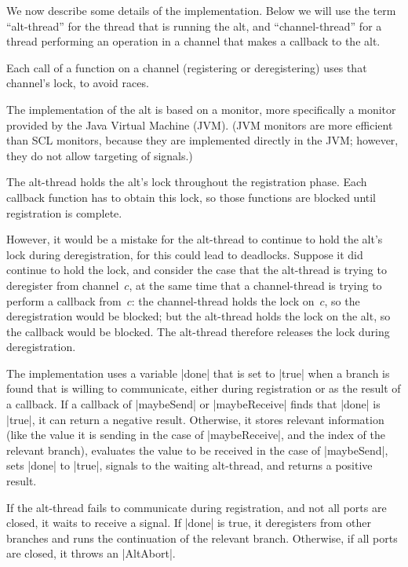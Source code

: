 We now describe some details of the implementation.  Below we will use the
term ``alt-thread'' for the thread that is running the alt, and
``channel-thread'' for a thread performing an operation in a channel that
makes a callback to the alt. 

Each call of a function on a channel (registering or deregistering) uses that
channel's lock, to avoid races.  

The implementation of the alt is based on a monitor, more specifically a
monitor provided by the Java Virtual Machine (JVM).  (JVM monitors are more
efficient than SCL monitors, because they are implemented directly in the JVM;
however, they do not allow targeting of signals.)  

The alt-thread holds the alt's lock throughout the registration phase.  Each
callback function has to obtain this lock, so those functions are blocked
until registration is complete. 

However, it would be a mistake for the alt-thread to continue to hold the
alt's lock during deregistration, for this could lead to deadlocks.  Suppose
it did continue to hold the lock, and consider the case that the alt-thread is
trying to deregister from channel~$c$, at the same time that a channel-thread
is trying to perform a callback from~$c$: the channel-thread holds the lock
on~$c$, so the deregistration would be blocked; but the alt-thread holds the
lock on the alt, so the callback would be blocked.  The alt-thread therefore
releases the lock during deregistration. 

The implementation uses a variable |done| that is set to |true| when a
branch is found that is willing to communicate, either during registration or
as the result of a callback.  If a callback of |maybeSend| or |maybeReceive|
finds that |done| is |true|, it can return a negative result.  Otherwise, it
stores relevant information (like the value it is sending in the case of
|maybeReceive|, and the index of the relevant branch), evaluates the value to
be received in the case of |maybeSend|, sets |done| to |true|, signals to the
waiting alt-thread, and returns a positive result.

If the alt-thread fails to communicate during registration, and not all
ports are closed, it waits to receive a signal.  If |done| is true, it
deregisters from other branches and runs the continuation of the relevant
branch.  Otherwise, if all ports are closed, it throws an |AltAbort|. 


